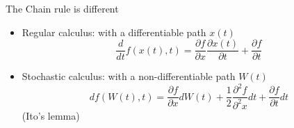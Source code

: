 \documentclass{beamer}
\begin{document}
\begin{frame}[shrink=25]{{\color{cyan}{\large Option Pricing in a Liquid Market: Stochastic Calculus}}}
\bigskip

The Chain rule is different

\vspace{10pt}
\begin{itemize}
\item Regular calculus: with a differentiable path $x(t)$
\begin{equation*}
\frac{d}{dt}f(x(t),t)=\frac{\partial f}{\partial x}\frac{\partial x(t)}{\partial t}+\frac{\partial f}{\partial t}
\end{equation*}

\vspace{10pt}
\item Stochastic calculus: with a non-differentiable path $W(t)$
\begin{equation*}
df(W(t),t)=\frac{\partial f}{\partial x}dW(t)+\frac{1}{2}\frac{\partial^{2}f}{\partial^{2}x}dt+\frac{\partial f}{\partial t}dt
\end{equation*}
(Ito's lemma)
\end{itemize}

\end{frame}
\end{document}
